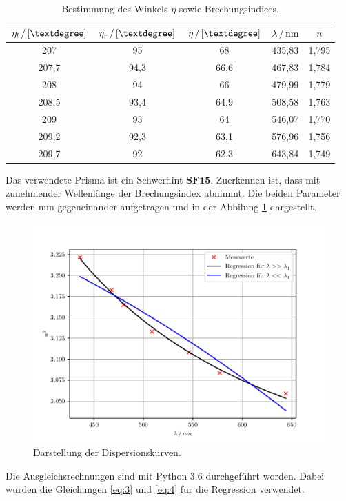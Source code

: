 \begin{table}[H]
  \centering
  \caption{Bestimmung des Winkels $\eta$ sowie Brechungsindices.}
  \label{tab:2}
  \begin{tabular}{c c c c c}
    \toprule
    $\eta_l\,/\,[\textdegree]$ & $\eta_r\,/\,[\textdegree]$ & $\eta \,/\,[\textdegree]$ &$\lambda \,/\,\si{\nano\meter}$ & $n$\\
    \midrule
    207 & 95 & 68 & 435,83 & 1,795\\
    207,7 & 94,3 & 66,6 & 467,83 & 1,784\\
    208 & 94 & 66 & 479,99 & 1,779\\
    208,5 & 93,4 & 64,9 & 508,58 & 1,763\\
    209 & 93 & 64 & 546,07 & 1,770\\
    209,2 & 92,3 & 63,1 & 576,96 & 1,756\\
    209,7 & 92 & 62,3 & 643,84 & 1,749\\
    \bottomrule
  \end{tabular}
\end{table}
Das verwendete Prisma ist ein Schwerflint $\textbf{SF15}$. Zuerkennen ist, dass
mit zunehmender Wellenlänge der Brechungsindex abnimmt.
Die beiden Parameter werden nun gegeneinander aufgetragen und in der Abbilung \ref{abb:4} dargestellt.
\begin{figure}[H]
  \centering
  \includegraphics[width=\textwidth]{plot1.pdf}
  \caption{Darstellung der Dispersionskurven.}
  \label{abb:4}
\end{figure}
Die Ausgleichsrechnungen sind mit Python 3.6 durchgeführt worden. Dabei wurden
die Gleichungen \ref{eq:3} und \ref{eq:4} für die Regression verwendet.
